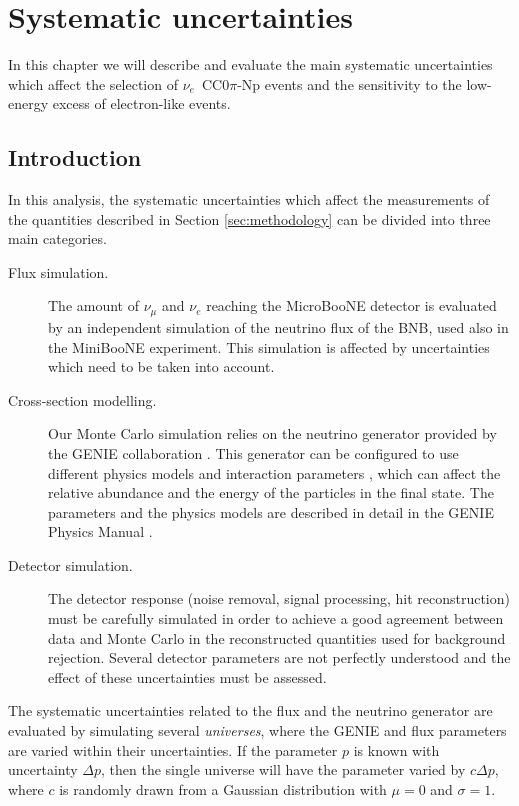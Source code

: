 \chapter{Systematic uncertainties}\label{sec:systematics}
\minitoc

In this chapter we will describe and evaluate the main systematic uncertainties which affect the selection of $\nu_e$~CC0$\pi$-Np events and the sensitivity to the low-energy excess of electron-like events.

\section{Introduction}
In this analysis, the systematic uncertainties which affect the measurements of the quantities described in Section \ref{sec:methodology} can be divided into three main categories.
\begin{description}
\item[Flux simulation.] The amount of $\nu_{\mu}$ and $\nu_{e}$ reaching the MicroBooNE detector is evaluated by an independent simulation of the neutrino flux of the BNB, used also in the MiniBooNE experiment. This simulation is affected by uncertainties which need to be taken into account.

\item[Cross-section modelling.] Our Monte Carlo simulation relies on the neutrino generator provided by the GENIE collaboration \cite{Andreopoulos:2009rq}. This generator can be configured to use different physics models and interaction parameters , which can affect the relative abundance and the energy of the particles in the final state. The parameters and the physics models are described in detail in the GENIE Physics Manual \cite{Andreopoulos:2015wxa}.

\item[Detector simulation.] The detector response (noise removal, signal processing, hit reconstruction) must be carefully simulated in order to achieve a good agreement between data and Monte Carlo in the reconstructed quantities used for background rejection. Several detector parameters are not perfectly understood and the effect of these uncertainties must be assessed. 
\end{description}

The systematic uncertainties related to the flux and the neutrino generator are evaluated by simulating several \emph{universes}, where the GENIE and flux parameters are varied within their uncertainties. If the parameter $p$ is known with uncertainty $\Delta p$, then the single universe will have the parameter varied by $c\Delta p$, where $c$ is randomly drawn from a Gaussian distribution with $\mu=0$ and $\sigma=1$.

